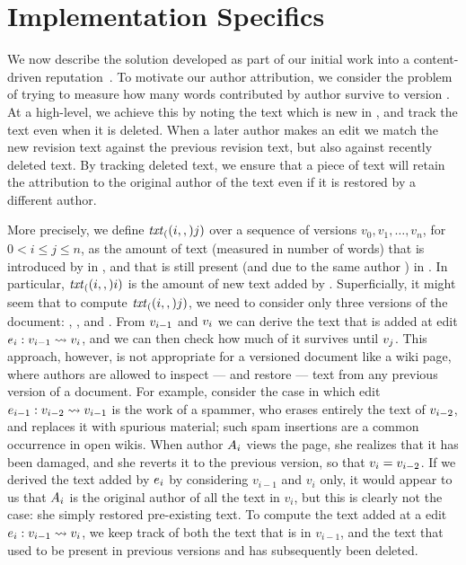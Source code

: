 \section{Implementation Specifics}

We now describe the solution
developed as part of our initial work into a
content-driven reputation~\cite{Adler2007}.
To motivate our author attribution, we consider the problem of
trying to measure how many words contributed by author 
survive to version .
At a high-level, we achieve this by noting the text which
is new in , and track the text even when it is deleted. 
When a later author makes an edit we match the new revision text
against the previous revision text, but also against recently
deleted text.
By tracking deleted text, we ensure that a piece of text
will retain the attribution to the original author of the text
even if it is restored by a different author.

More precisely,
we define $\mathit{txt}_{(}(i,,)j)$
over a
sequence of versions $v_0, v_1, \ldots, v_n$,
for $0 < i \leq j \leq n$, as the amount of text
(measured in number of words) that is introduced
by  in ,
and that is still present (and due to the same author )
in .
In particular, $\mathit{txt}_{(}(i,,)i)$ is the amount of new text added by .
Superficially, it might seem that to compute $\mathit{txt}_{(}(i,,)j)$, we need to
consider only three versions of the document: ,
, and
.
From $v_{i-1}$ and $v_{i}$
we can derive the text that is added at edit
$e_{i}: v_{i-1} \rightsquigarrow v_{i}$,
and we can then check how much of it
survives until $v_{j}$.
This approach, however, is not appropriate for a versioned document
like a wiki page, where authors are allowed to inspect --- and restore
--- text from any previous version of a document.
For example, consider the case in which edit
$e_{i-1}: v_{i-2} \rightsquigarrow v_{i-1}$ is the work
of a spammer, who erases entirely the text of $v_{i-2}$, and replaces
it with spurious material; such spam insertions are a common
occurrence in open wikis.
When author $A_{i}$ views the page, she realizes that it has been damaged,
and she reverts it to the previous version, so that
$v_{i} = v_{i-2}$.
If we derived the text added by $e_{i}$ by considering $v_{i-1}$ and
$v_i$ only, it would appear to us that $A_{i}$ is the original author of
all the text in $v_i$, but this is clearly not the case: she simply
restored pre-existing text.
To compute the text added at a edit $e_{i}: v_{i-1} \rightsquigarrow v_i$,
we keep track of both the text that is in $v_{i-1}$, and the text that used to
be present in previous versions and has subsequently been deleted.

